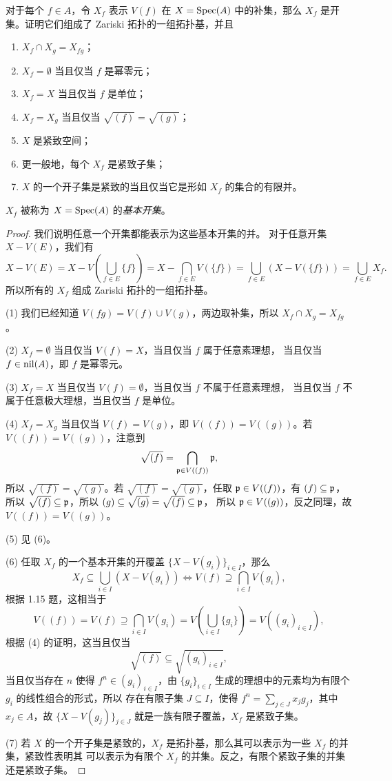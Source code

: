 \begin{problem}
  对于每个 $f\in A$，令 $X_f$ 表示 $V(f)$ 在 $X=\operatorname{Spec}(A)$ 中的补集，那么
  $X_f$ 是开集。证明它们组成了 Zariski 拓扑的一组拓扑基，并且
  \begin{enumerate}
    \item $X_f\cap X_g=X_{fg}$；
    \item $X_f=\emptyset$ 当且仅当 $f$ 是幂零元；
    \item $X_f=X$ 当且仅当 $f$ 是单位；
    \item $X_f=X_g$ 当且仅当 $\sqrt{(f)}=\sqrt{(g)}$；
    \item $X$ 是紧致空间；
    \item 更一般地，每个 $X_f$ 是紧致子集；
    \item $X$ 的一个开子集是紧致的当且仅当它是形如 $X_f$ 的集合的有限并。
  \end{enumerate}
  $X_f$ 被称为 $X=\operatorname{Spec}(A)$ 的\emph{基本开集}。
\end{problem}
\begin{proof}
  我们说明任意一个开集都能表示为这些基本开集的并。
  对于任意开集 $X-V(E)$，我们有
  \[
    X-V(E)=X-V\left(\bigcup_{f\in E}\{f\}\right)  
    =X-\bigcap_{f\in E}V(\{f\})
    =\bigcup_{f\in E} (X-V(\{f\}))
    =\bigcup_{f\in E}X_f.
  \]
  所以所有的 $X_f$ 组成 Zariski 拓扑的一组拓扑基。

  (1) 我们已经知道 $V(fg)=V(f)\cup V(g)$，两边取补集，所以
  $X_f\cap X_g=X_{fg}$。

  (2) $X_f=\emptyset$ 当且仅当 $V(f)=X$，当且仅当 $f$ 属于任意素理想，
  当且仅当 $f\in\operatorname{nil}(A)$，即 $f$ 是幂零元。

  (3) $X_f=X$ 当且仅当 $V(f)=\emptyset$，当且仅当 $f$ 不属于任意素理想，
  当且仅当 $f$ 不属于任意极大理想，当且仅当 $f$ 是单位。

  (4) $X_f=X_g$ 当且仅当 $V(f)=V(g)$，即 $V((f))=V((g))$。若 $V((f))=V((g))$，注意到
  \[
    \sqrt{(f)}=\bigcap_{\mathfrak{p}\in V((f))}\mathfrak{p},  
  \]
  所以 $\sqrt{(f)}=\sqrt{(g)}$。若 $\sqrt{(f)}=\sqrt{(g)}$，任取
  $\mathfrak{p}\in V((f))$，有 $(f)\subseteq \mathfrak{p}$，所以 
  $\sqrt{(f)}\subseteq \mathfrak{p}$，所以 $(g)\subseteq \sqrt{(g)}=\sqrt{(f)}\subseteq\mathfrak{p}$，
  所以 $\mathfrak{p}\in V((g))$，反之同理，故 $V((f))=V((g))$。

  (5) 见 (6)。

  (6) 任取 $X_f$ 的一个基本开集的开覆盖 $\{X-V(g_i)\}_{i\in I}$，那么
  \[
    X_f\subseteq\bigcup_{i\in I}(X-V(g_i))  \Leftrightarrow
    V(f)\supseteq \bigcap_{i\in I} V(g_i),
  \]
  根据 1.15 题，这相当于
  \[
    V((f))=V(f)\supseteq \bigcap_{i\in I} V(g_i)=V\left(\bigcup_{i\in I}\{g_i\}\right)
    =V\left((g_i)_{i\in I}\right),
  \]
  根据 (4) 的证明，这当且仅当
  \[
    \sqrt{(f)}\subseteq \sqrt{(g_i)_{i\in I}},  
  \]
  当且仅当存在 $n$ 使得 $f^n\in(g_i)_{i\in I}$，由 $\{g_i\}_{i\in I}$
  生成的理想中的元素均为有限个 $g_i$ 的线性组合的形式，所以
  存在有限子集 $J\subseteq I$，使得 $f^n=\sum_{j\in J} x_jg_j$，其中
  $x_j\in A$，故 $\{X-V(g_j)\}_{j\in J}$ 就是一族有限子覆盖，$X_f$ 是紧致子集。

  (7) 若 $X$ 的一个开子集是紧致的，$X_f$ 是拓扑基，那么其可以表示为一些 $X_f$ 的并集，紧致性表明其
  可以表示为有限个 $X_f$ 的并集。反之，有限个紧致子集的并集还是紧致子集。
\end{proof}

